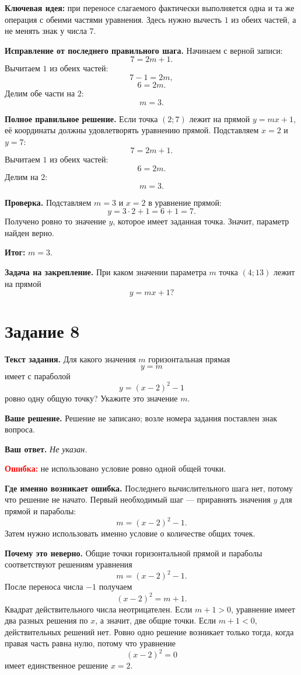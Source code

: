 \documentclass[12pt,a4paper]{article}
\newcommand{\studentanswer}[1]{\textit{#1}}
\begin{document}
\textcolor{blue!60!black}{\textbf{Ключевая идея:}}
при переносе слагаемого фактически выполняется одна и та же операция с обеими частями уравнения. Здесь нужно вычесть $1$ из обеих частей, а не менять знак у числа $7$.

\textbf{Исправление от последнего правильного шага.}
Начинаем с верной записи:
\[
7=2m+1.
\]
Вычитаем $1$ из обеих частей:
\[
7-1=2m,
\]
\[
6=2m.
\]
Делим обе части на $2$:
\[
m=3.
\]

\textbf{Полное правильное решение.}
Если точка $(2;7)$ лежит на прямой $y=mx+1$, её координаты должны удовлетворять уравнению прямой. Подставляем $x=2$ и $y=7$:
\[
7=2m+1.
\]
Вычитаем $1$ из обеих частей:
\[
6=2m.
\]
Делим на $2$:
\[
m=3.
\]

\textbf{Проверка.}
Подставляем $m=3$ и $x=2$ в уравнение прямой:
\[
y=3\cdot 2+1=6+1=7.
\]
Получено ровно то значение $y$, которое имеет заданная точка. Значит, параметр найден верно.

\textcolor{teal!60!black}{\textbf{Итог:}}
$m=3$.

\textbf{Задача на закрепление.}
При каком значении параметра $m$ точка $(4;13)$ лежит на прямой
\[
y=mx+1?
\]

\newpage
{}\label{task:8}
\section*{Задание 8}

\textbf{Текст задания.}
Для какого значения $m$ горизонтальная прямая
\[
y=m
\]
имеет с параболой
\[
y=(x-2)^2-1
\]
ровно одну общую точку? Укажите это значение $m$.

\textbf{Ваше решение.}
Решение не записано; возле номера задания поставлен знак вопроса.

\textbf{Ваш ответ.}
\studentanswer{Не указан.}

\textcolor{red}{\textbf{Ошибка:}} не использовано условие ровно одной общей точки.

\textbf{Где именно возникает ошибка.}
Последнего вычислительного шага нет, потому что решение не начато. Первый необходимый шаг --- приравнять значения $y$ для прямой и параболы:
\[
m=(x-2)^2-1.
\]
Затем нужно использовать именно условие о количестве общих точек.

\textbf{Почему это неверно.}
Общие точки горизонтальной прямой и параболы соответствуют решениям уравнения
\[
m=(x-2)^2-1.
\]
После переноса числа $-1$ получаем
\[
(x-2)^2=m+1.
\]
Квадрат действительного числа неотрицателен. Если $m+1>0$, уравнение имеет два разных решения по $x$, а значит, две общие точки. Если $m+1<0$, действительных решений нет. Ровно одно решение возникает только тогда, когда правая часть равна нулю, потому что уравнение
\[
(x-2)^2=0
\]
имеет единственное решение $x=2$.
\end{document}
